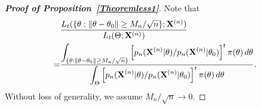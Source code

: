 \documentclass[11pt]{article}
\theoremstyle{plain}
\theoremstyle{definition}
\theoremstyle{remark}
\begin{document}
\begin{appendices}
\begin{proof}[\textbf{Proof of Proposition~\ref{Theoremless1}}]
    Note that
       \begin{equation}\label{eq:numden}
           \begin{split}
           &\frac{L_{t} (\{\theta: \|\theta-\theta_0\|\geq {M_n}/{\sqrt{n}}\};\mathbf{X}^{(n)})}
           {L_{t}(\Theta;\mathbf{X}^{(n)})}
           \\
=&
    \frac{\displaystyle
        \int_{\{\theta: \|\theta-\theta_0\|\geq {M_n}/{\sqrt{n}}\}} \left[ {p_n(\mathbf{X}^{(n)}|\theta)}/{p_n(\mathbf{X}^{(n)}|\theta_0)} \right]^{t} \pi(\theta) \, d \theta
    }{\displaystyle
        \int_{\Theta} \left[ {p_n(\mathbf{X}^{(n)}|\theta)}/{p_n(\mathbf{X}^{(n)}|\theta_0)} \right]^{t} \pi(\theta) \, d \theta
    }.
           \end{split}
       \end{equation}
    Without loss of generality, we assume ${M_n}/{\sqrt{n}}\to 0$.


\end{proof}
\end{appendices}
\end{document}
